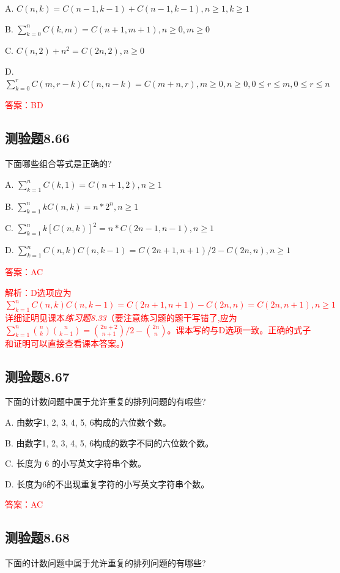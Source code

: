 \documentclass[UTF8, heading=true]{ctexart}
\begin{document}
A. $C(n, k)=C(n-1, k-1)+C(n-1, k-1),  n \geq 1, k \geq 1$

B. $ \sum_{k=0}^n C(k, m)=C(n+1, m+1),  n \geq 0, m \geq 0$

C. $C(n, 2)+n^2=C(2 n, 2),  n \geq 0$

D. $ \sum_{k=0}^r C(m, r-k) C(n, n-k)=C(m+n, r), m \geq 0, n \geq 0,0 \leq r \leq m, 0 \leq r \leq n$

\textcolor{red}{答案：BD}

\subsection{测验题8.66}

下面哪些组合等式是正确的?

A. $ \sum_{k=1}^n C(k, 1)=C(n+1,2), n \geq 1$

B. $\sum_{k=1}^n k C(n, k)=n * 2^n, n \geq 1$

C. $ \sum_{k=1}^n k[C(n, k)]^2=n * C(2 n-1, n-1), n \geq 1$

D. $ \sum_{k=1}^n C(n, k) C(n, k-1)=C(2 n+1, n+1) / 2-C(2 n, n), n \geq 1$

\textcolor{red}{答案：AC}

\textcolor{red}{解析：D选项应为$ \sum_{k=1}^n C(n, k) C(n, k-1)=C(2 n+1, n+1)-C(2 n, n) = C(2n,n+1), n \geq 1$
详细证明见课本\textit{练习题8.33}（要注意练习题的题干写错了,应为$\sum_{k=1}^n\binom{n}{k}\binom{n}{k-1}=\binom{2 n+2}{n+1} / 2-\binom{2 n}{n}$。课本写的与D选项一致。正确的式子和证明可以直接查看课本答案。）}

\subsection{测验题8.67}

下面的计数问题中属于允许重复的排列问题的有㗇些?

A. 由数字1, 2, 3, 4, 5, 6构成的六位数个数。

B. 由数字1, 2, 3, 4, 5, 6构成的数字不同的六位数个数。

C. 长度为 6 的小写英文字符串个数。

D. 长度为6的不出现重复字符的小写英文字符串个数。

\textcolor{red}{答案：AC}


\subsection{测验题8.68}

下面的计数问题中属于允许重复的排列问题的有哪些?
\end{document}
